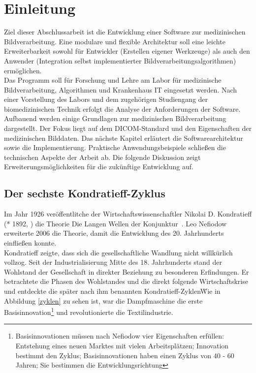 \chapter{Einleitung}\label{einleitung}

Ziel dieser Abschlussarbeit ist die Entwicklung einer Software zur medizinischen Bildverarbeitung. Eine modulare und flexible Architektur soll eine leichte Erweiterbarkeit sowohl für Entwickler (Erstellen eigener Werkzeuge) als auch den Anwender (Integration selbst implementierter Bildverarbeitungsalgorithmen) ermöglichen.\\
Das Programm soll für Forschung und Lehre am Labor für medizinische Bildverarbeitung, Algorithmen und Krankenhaus IT eingesetzt werden. Nach einer Vorstellung des Labors und dem zugehörigen Studiengang der biomedizinischen Technik erfolgt die Analyse der Anforderungen der Software. Aufbauend werden einige Grundlagen zur medizinischen Bildverarbeitung dargestellt. Der Fokus liegt auf dem DICOM-Standard und den Eigenschaften der medizinischen Bilddaten. Das nächste Kapitel erläutert die Softwarearchitektur sowie die Implementierung. Praktische Anwendungsbeispiele schließen die technischen Aspekte der Arbeit ab. Die folgende Diskussion zeigt Erweiterungsmöglichkeiten für die zukünftige Entwicklung auf.

\section{Der sechste Kondratieff-Zyklus}
Im Jahr 1926 veröffentlitche der Wirtschaftswissenschaftler Nikolai D. Kondratieff (* 1892, ) die Theorie \glqq Die Langen Wellen der Konjunktur\grqq\ \cite{hensen:gesundeGesellschaft}.
Leo Nefiodow erweiterte 2006 die Theorie, damit die Entwicklung des 20. Jahrhunderts einfließen konnte.\\
Kondratieff zeigte, dass sich die gesellschaftliche Wandlung nicht willkürlich vollzog. Seit der Industrialisierung Mitte des 18. Jahrhunderts stand der Wohlstand der Gesellschaft in direkter Beziehung zu besonderen Erfindungen. Er betrachtete die Phasen des Wohlstandes und die direkt folgende Wirtschaftskrise und entdeckte die später nach ihm benannten \glqq Kondratieff-Zyklen\grqq\.
Wie in Abbildung \ref{zyklen} zu sehen ist, war die Dampfmaschine die erste Basisinnovation\footnote{Basisinnovationen müssen nach Nefiodow vier Eigenschaften erfüllen: Entstehung eines neuen Marktes mit vielen Arbeitsplätzen; Innovation bestimmt den Zyklus; Basisinnovationen haben einen Zyklus von 40 - 60 Jahren; Sie bestimmen die Entwicklungsrichtung} und revolutionierte die Textilindustrie.\cite{wieden:liquidwork}


